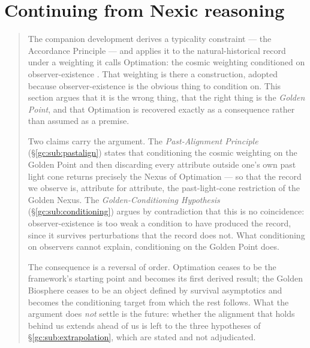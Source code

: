 \documentclass[11pt]{article}
\numberwithin{equation}{section}
\theoremstyle{plain}
\theoremstyle{definition}
\theoremstyle{remark}
\begin{document}


\section{Continuing from Nexic reasoning}\label{gc:sec}

\begin{quote}\small
The companion development derives a typicality constraint --- the
Accordance Principle --- and applies it to the natural-historical record
under a weighting it calls Optimation: the cosmic weighting conditioned
on observer-existence \cite{Nexus, Ben26Found, Ben26Optimal}. That
weighting is there a construction, adopted because observer-existence is
the obvious thing to condition on. This section argues that it is the
wrong thing, that the right thing is the \emph{Golden Point}, and that
Optimation is recovered exactly as a consequence rather than assumed as
a premise.

Two claims carry the argument. The \emph{Past-Alignment Principle}
(\S\ref{gc:sub:pastalign}) states that conditioning the cosmic weighting
on the Golden Point and then discarding every attribute outside one's
own past light cone returns precisely the Nexus of Optimation --- so
that the record we observe is, attribute for attribute, the past-light-cone
restriction of the Golden Nexus. The \emph{Golden-Conditioning
Hypothesis} (\S\ref{gc:sub:conditioning}) argues by contradiction that
this is no coincidence: observer-existence is too weak a condition to
have produced the record, since it survives perturbations that the
record does not. What conditioning on observers cannot explain,
conditioning on the Golden Point does.

The consequence is a reversal of order. Optimation ceases to be the
framework's starting point and becomes its first derived result; the
Golden Biosphere ceases to be an object defined by survival asymptotics
and becomes the conditioning target from which the rest follows. What
the argument does \emph{not} settle is the future: whether the alignment
that holds behind us extends ahead of us is left to the three
hypotheses of \S\ref{gc:sub:extrapolation}, which are stated and not
adjudicated.
\end{quote}
\end{document}
